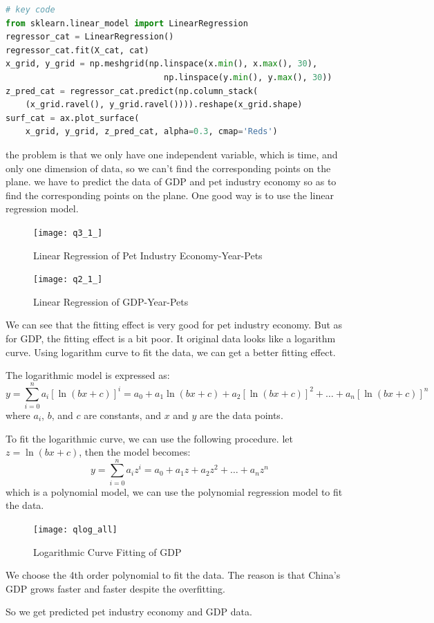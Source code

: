 \documentclass[withoutpreface,bwprint]{cumcmthesis} %
\begin{document}
\begin{lstlisting}[language=python]
# key code
from sklearn.linear_model import LinearRegression
regressor_cat = LinearRegression()
regressor_cat.fit(X_cat, cat)
x_grid, y_grid = np.meshgrid(np.linspace(x.min(), x.max(), 30),
                                np.linspace(y.min(), y.max(), 30))
z_pred_cat = regressor_cat.predict(np.column_stack(
    (x_grid.ravel(), y_grid.ravel()))).reshape(x_grid.shape)
surf_cat = ax.plot_surface(
    x_grid, y_grid, z_pred_cat, alpha=0.3, cmap='Reds')
\end{lstlisting}
\par the problem is that we only have one independent variable, which is time,
and only one dimension of data, so we can't find the corresponding points on the plane.
we have to predict the data of GDP and pet industry economy 
so as to find the corresponding points on the plane.
One good way is to use the linear regression model.
\clearpage
\begin{figure}[htbp]
	\centering
	\texttt{[image: q3\_1\_]}
	\caption{Linear Regression of Pet Industry Economy-Year-Pets}
\end{figure}
\begin{figure}[htbp]
	\centering
	\texttt{[image: q2\_1\_]}
	\caption{Linear Regression of GDP-Year-Pets}
\end{figure}
\par We can see that the fitting effect is very good for pet industry economy.
But as for GDP, the fitting effect is a bit poor. It original data looks like a logarithm curve.
Using logarithm curve to fit the data, we can get a better fitting effect.
\begin{definition}
The logarithmic model is expressed as:
\[
y = \sum_{i=0}^{n} a_i [\ln(bx + c)]^i = a_0 + a_1 \ln(bx + c) + a_2 [\ln(bx + c)]^2 + \dots + a_n [\ln(bx + c)]^n
\]
where \(a_i\), \(b\), and \(c\) are constants, and \(x\) and \(y\) are the data points.
\end{definition}
\begin{solution}
To fit the logarithmic curve, we can use the following procedure.
let \(z = \ln(bx + c)\), then the model becomes:
\[
y = \sum_{i=0}^{n} a_i z^i = a_0 + a_1 z + a_2 z^2 + \dots + a_n z^n
\]
which is a polynomial model, we can use the polynomial regression model to fit the data.
\end{solution}
\begin{figure}[htbp]
	\centering
	\texttt{[image: qlog\_all]}
	\caption{Logarithmic Curve Fitting of GDP}
\end{figure}
\par We choose the 4th order polynomial to fit the data.
The reason is that China's GDP grows faster and faster despite the overfitting.
\par So we get predicted pet industry economy and GDP data.
\end{document}
